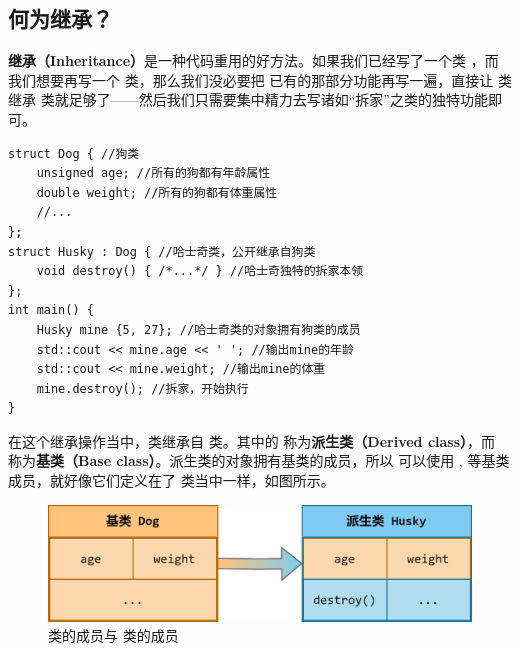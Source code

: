\subsection*{何为继承？}
\textbf{继承（Inheritance）}是一种代码重用的好方法。如果我们已经写了一个类 \lstinline@Dog@，而我们想要再写一个 \lstinline@Husky@ 类，那么我们没必要把 \lstinline@Dog@ 已有的那部分功能再写一遍，直接让 \lstinline@Husky@ 类继承 \lstinline@Dog@ 类就足够了——然后我们只需要集中精力去写诸如``拆家''之类的独特功能即可。\par
\begin{lstlisting}
struct Dog { //狗类
    unsigned age; //所有的狗都有年龄属性
    double weight; //所有的狗都有体重属性
    //...
};
struct Husky : Dog { //哈士奇类，公开继承自狗类
    void destroy() { /*...*/ } //哈士奇独特的拆家本领
};
int main() {
    Husky mine {5, 27}; //哈士奇类的对象拥有狗类的成员
    std::cout << mine.age << ' '; //输出mine的年龄
    std::cout << mine.weight; //输出mine的体重
    mine.destroy(); //拆家，开始执行
}
\end{lstlisting}
在这个继承操作当中，\lstinline@Husky@ 类继承自 \lstinline@Dog@ 类。其中的 \lstinline@Husky@ 称为\textbf{派生类（Derived class）}，而 \lstinline@Dog@ 称为\textbf{基类（Base class）}。派生类的对象拥有基类的成员，所以 \lstinline@mine@ 可以使用 \lstinline@age@, \lstinline@weight@ 等基类成员，就好像它们定义在了 \lstinline@Husky@ 类当中一样，如图所示。
\begin{figure}[htbp]
    \centering
    \includegraphics[width=.8\textwidth]{../images/generalized_parts/09_dog_and_husky_relationship.png}
    \caption{\lstinline@Dog@ 类的成员与 \lstinline@Husky@ 类的成员}
\end{figure}\par
